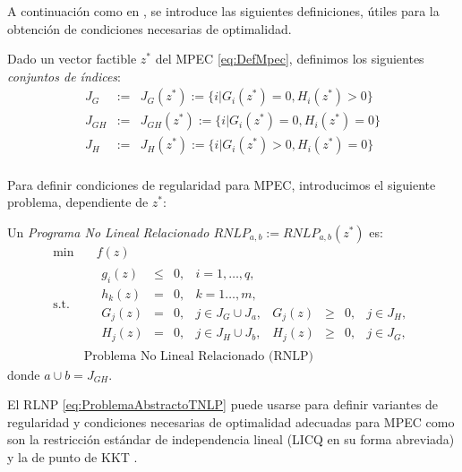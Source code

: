 A continuación como en \cite{Flegel2003AFJ}, se introduce las siguientes definiciones, útiles para la obtención de condiciones necesarias de optimalidad.
\begin{definition}
Dado un vector factible $z^*$ del MPEC \eqref{eq:DefMpec}, definimos los siguientes \textit{conjuntos de índices}:
\begin{equation}
\begin{aligned}
J_G&:=& J_G(z^*) := \{i|G_i(z^*) = 0, H_i(z^*) > 0\} \\
J_{GH}&:=& J_{GH}(z^*) := \{i|G_i(z^*) = 0, H_i(z^*) = 0\}  \\
J_H &:= &J_H(z^*) := \{i|G_i(z^*) > 0, H_i(z^*) = 0\}  \\
\end{aligned}
\label{eq:ConjuntoDeIndices} 
\end{equation}
\end{definition}

Para definir condiciones de regularidad para MPEC, introducimos el siguiente problema, dependiente de $z^*$:

\begin{definition}

Un \textit{Programa No Lineal Relacionado $RNLP_{a,b} := RNLP_{a,b}(z^*)$} es:
\begin{equation}
\begin{aligned}
\min  &\quad  f(z)  \\
\text{s.t.} &\quad \begin{matrix} g_i(z)& \leq& 0, &i=1,\ldots,q, \\ h_k(z) &=& 0,&k=1\ldots,m, \\
 G_j(z) &=& 0, & j\in J_G\cup J_{a},& G_j(z) &\geq& 0, & j\in J_H,\\ 
H_j(z) &=& 0, & j\in J_H\cup J_{b},& H_j(z) &\geq& 0, & j\in J_G,\end{matrix}\\
& \text{Problema No Lineal Relacionado (RNLP)}  
\end{aligned}
\label{eq:ProblemaAbstractoTNLP}
\end{equation}
    donde $a\cup b=J_{GH}$.
\end{definition}

El RLNP \eqref{eq:ProblemaAbstractoTNLP} puede  usarse para definir variantes de regularidad y condiciones necesarias de optimalidad  adecuadas para MPEC como son la  restricción estándar de independencia lineal (LICQ en su forma abreviada) y la de punto de KKT .

